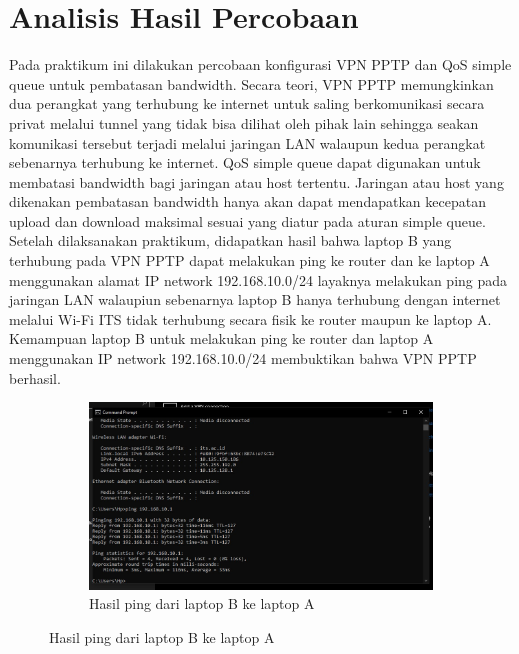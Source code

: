 \section{Analisis Hasil Percobaan}
Pada praktikum ini dilakukan percobaan konfigurasi VPN PPTP dan QoS simple queue untuk pembatasan bandwidth. Secara teori, VPN PPTP memungkinkan dua perangkat yang terhubung ke internet untuk saling berkomunikasi secara privat melalui tunnel yang tidak bisa dilihat oleh pihak lain sehingga seakan komunikasi tersebut terjadi melalui jaringan LAN walaupun kedua perangkat sebenarnya terhubung ke internet. QoS simple queue dapat digunakan untuk membatasi bandwidth bagi jaringan atau host tertentu. Jaringan atau host yang dikenakan pembatasan bandwidth hanya akan dapat mendapatkan kecepatan upload dan download maksimal sesuai yang diatur pada aturan simple queue. Setelah dilaksanakan praktikum, didapatkan hasil bahwa laptop B yang terhubung pada VPN PPTP dapat melakukan ping ke router dan ke laptop A menggunakan alamat IP network 192.168.10.0/24 layaknya melakukan ping pada jaringan LAN walaupiun sebenarnya laptop B hanya terhubung dengan internet melalui Wi-Fi ITS tidak terhubung secara fisik ke router maupun ke laptop A. Kemampuan laptop B untuk melakukan ping ke router dan laptop A menggunakan IP network 192.168.10.0/24 membuktikan bahwa VPN PPTP berhasil.
\begin{figure}[H]
	\centering
	\begin{subfigure}[b]{0.4\linewidth}
		\includegraphics[width=\linewidth]{P5/img/ping laptop.jpg}
		\caption{Hasil ping dari laptop B ke laptop A\label{fig:konfigurasiR1}}
	\end{subfigure}
\end{figure}


